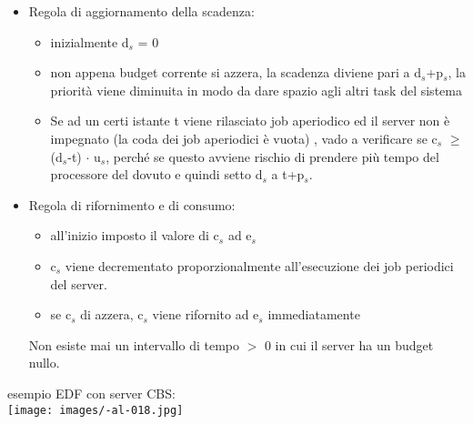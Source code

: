 \documentclass{article}
\begin{document}
\begin{itemize}
\item Regola di aggiornamento della scadenza:
\begin{itemize}
\item inizialmente d$_{s}$ = 0
\item non appena budget corrente si azzera, la scadenza diviene pari a d$_{s}$+p$_{s}$, la priorità viene diminuita in modo da dare spazio agli altri task del sistema
\item Se ad un certi istante t viene rilasciato job aperiodico ed il server non è impegnato (la coda dei job aperiodici è vuota) , vado a verificare se c$_{s}$ $\geq$ (d$_{s}$-t) $\cdot$ u$_{s}$, perché se questo avviene rischio di prendere più tempo del processore del dovuto e quindi setto d$_{s}$ a t+p$_{s}$.
\end{itemize}
\item Regola di rifornimento e di consumo:
\begin{itemize}
\item all'inizio imposto il valore di c$_{s}$ ad e$_{s}$
\item c$_{s}$ viene decrementato proporzionalmente all'esecuzione dei job periodici del server.
\item se c$_{s}$ di azzera, c$_{s}$ viene rifornito ad e$_{s}$ immediatamente
\end{itemize}
Non esiste mai un intervallo di tempo $>$ 0 in cui il server ha un budget nullo.
\end{itemize}
esempio EDF con server CBS:\\
\texttt{[image: images/-al-018.jpg]}
\end{document}
